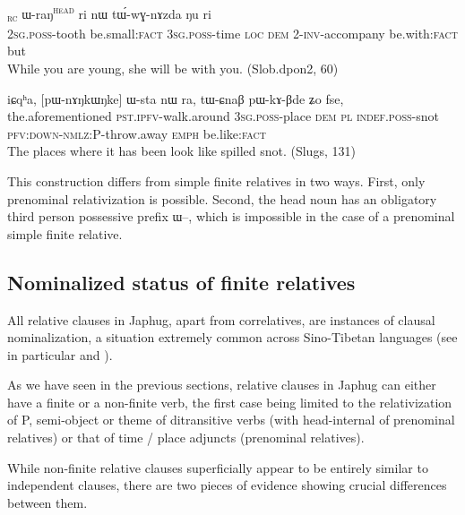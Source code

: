 \documentclass[oldfontcommands,oneside,a4paper,11pt]{article}
\newcommand{\ipa}[1]{{\phon #1}} %
\newcommand{\topic}{\textsc{dem}}
\newcommand{\tete}{\textsuperscript{\textsc{head}}}
\newcommand{\rc}{\textsubscript{\textsc{rc}}}
\begin{document}
\begin{exe}
   \ex \label{ex:WraN2}
 \gll [\ipa{nɤ-ɕɣa}   	\ipa{xtɕi}]\rc{}   	\ipa{ɯ-raŋ}\tete{}   	\ipa{ri}   	\ipa{nɯ}   	\ipa{tɯ́-wɣ-nɤzda}   	\ipa{ŋu}   	\ipa{ri}   \\
 \textsc{2sg.poss}-tooth be.small:\textsc{fact} \textsc{3sg.poss}-time \textsc{loc} \topic{} 2-\textsc{inv}-accompany be.with:\textsc{fact} but \\
\glt While you are young, she will be with you. (Slob.dpon2, 60)
\end{exe}

\begin{exe}
   \ex \label{ex:Wsta2}
 \gll
\ipa{iɕqʰa,}  	[\ipa{pɯ-nɤŋkɯŋke}]  	\ipa{ɯ-sta}  	\ipa{nɯ} \ipa{ra,}  	\ipa{tɯ-ɕnaβ}  	\ipa{pɯ-kɤ-βde}  	\ipa{ʑo}  	\ipa{fse,}  \\
the.aforementioned \textsc{pst.ipfv}-walk.around \textsc{3sg.poss}-place \topic{} \textsc{pl} \textsc{indef.poss}-snot \textsc{pfv:down-nmlz:P}-throw.away \textsc{emph} be.like:\textsc{fact} \\
\glt The places where it has been look like spilled snot. (Slugs, 131)
\end{exe}

This construction differs from simple finite relatives in two ways. First, only prenominal relativization is possible. Second, the  head noun has an obligatory third person possessive prefix \ipa{ɯ--}, which is impossible in the case of a prenominal simple finite relative.

\subsection{Nominalized status of finite relatives}
All relative clauses in Japhug, apart from correlatives, are instances of clausal nominalization, a situation extremely common across Sino-Tibetan languages (see in particular \citealt{genetti08nmlz} and \citealt{bickel99nmlz}).

As we have seen in the previous sections, relative clauses in Japhug can either have a finite or a non-finite verb, the first case being limited to the relativization of P, semi-object or theme of ditransitive verbs (with head-internal of prenominal relatives) or that of time / place adjuncts (prenominal relatives). 

While non-finite relative clauses superficially appear to be entirely similar to independent clauses, there are two pieces of evidence showing crucial differences between them.
\end{document}
